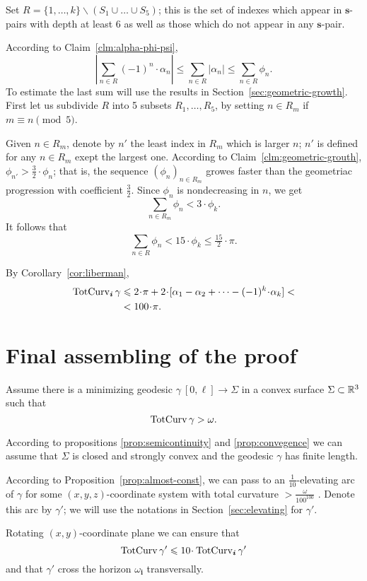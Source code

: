 \documentclass[a4paper,10pt]{amsart}
\begin{document}
Set $R=\{1,\dots,k\}\backslash (S_1\cup\dots\cup S_5)$;
this is the set of indexes which appear in $\bm{s}$-pairs with depth at least $6$ 
as well as those which do not appear in any $\bm{s}$-pair.

According to Claim~\ref{clm:alpha-phi-psi},
\[\left|\sum_{n\in R}
(-1)^n\cdot\alpha_n\right|
\le
\sum_{n\in R}
|\alpha_n|\le \sum_{n\in R}\phi_n.\] 
To estimate the last sum will use the results in Section~\ref{sec:geometric-growth}.
First let us subdivide $R$ into 5 subsets $R_1,\dots,R_5$,
by setting 
$n\in R_m$ if $m\equiv n\pmod 5$.

Given $n\in R_m$, denote by $n'$ the least index in $R_m$ which is larger $n$;
$n'$ is defined for any $n\in R_m$ exept the largest one.
According to Claim~\ref{clm:geometric-grouth}, 
$\phi_{n'}>\tfrac32\cdot \phi_n$;
that is, the sequence $(\phi_n)_{n\in R_m}$ growes faster than the geometriac progression with coefficient $\tfrac32$.
Since $\phi_n$ is nondecreasing in $n$,
we get 
\[\sum_{n\in R_m}\phi_n< 3\cdot\phi_k.\]
It follows that 
\[\sum_{n\in R}\phi_n< 15\cdot\phi_k\le\tfrac{15}2\cdot\pi.\]

By Corollary~\ref{cor:liberman},
\begin{align*}
\tc_{\bm{i}}\gamma
&\le 
2\cdot\pi
+
2\cdot [\alpha_1-\alpha_2+\dots-(-1)^k\cdot\alpha_k]< 
\\
&< 100\cdot \pi.
\end{align*}
\qeds



\section{Final assembling of the proof}


Assume there is a minimizing geodesic $\gamma\:[0,\ell]\to \Sigma$ in a convex surface $\Sigma\subset \mathbb{R}^3$ such that
\[\mathop{\rm TotCurv}\nolimits\gamma>\omega.\]

According to propositions \ref{prop:semicontinuity} and \ref{prop:convegence} we can assume that $\Sigma$ is closed and strongly convex
and the geodesic $\gamma$ has finite length.

According to Proposition~\ref{prop:almost-const}, 
we can pass to an $\tfrac1{10}$-elevating arc
of $\gamma$ for some $(x,y,z)$-coordinate system with total curvature $>\tfrac{\omega}{100^{100}}$%
.
Denote this arc by $\gamma'$;
we will use the notations in Section~\ref{sec:elevating} for $\gamma'$.

Rotating $(x,y)$-coordinate plane we can ensure that
\[\tc\gamma'\le 10\cdot\tc_{\bm{i}}\gamma'\]
and that $\gamma'$ cross the horizon $\omega_{\bm{i}}$ transversally.
\end{document}
